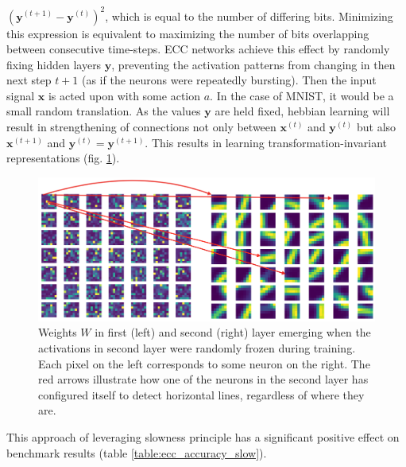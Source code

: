 \documentclass[12pt]{article}
\begin{document}
$(\boldsymbol{y}^{(t+1)}-\boldsymbol{y}^{(t)})^2$, which is equal to the number of differing bits. Minimizing this expression is equivalent to maximizing the number of bits overlapping between consecutive time-steps. ECC networks achieve this effect by randomly fixing hidden layers $\boldsymbol{y}$, preventing the activation patterns from changing in then next step $t+1$ (as if the neurons were repeatedly bursting). Then the input signal $\boldsymbol{x}$ is acted upon with some action $a$. In the case of MNIST, it would be a small random translation. 
As the values $\boldsymbol{y}$ are held fixed, hebbian learning will result in strengthening of connections not only between $\boldsymbol{x}^{(t)}$ and $\boldsymbol{y}^{(t)}$ but also $\boldsymbol{x}^{(t+1)}$ and $\boldsymbol{y}^{(t)}=\boldsymbol{y}^{(t+1)}$. This results in learning transformation-invariant representations (fig. \ref{fig:motor_drift}). 
\begin{figure}[!htbp]
	\centering
	\includegraphics[width=13.5cm]{motor_drift}
	\caption{Weights $W$ in first (left) and second (right) layer emerging when the activations in second layer were randomly frozen during training. Each pixel on the left corresponds to some neuron on the right. The red arrows illustrate how one of the neurons in the second layer has configured itself to detect horizontal lines, regardless of where they are.}
	\label{fig:motor_drift}
\end{figure} 
This approach of leveraging slowness principle has a significant  positive effect on benchmark results (table \ref{table:ecc_accuracy_slow}).
\end{document}

